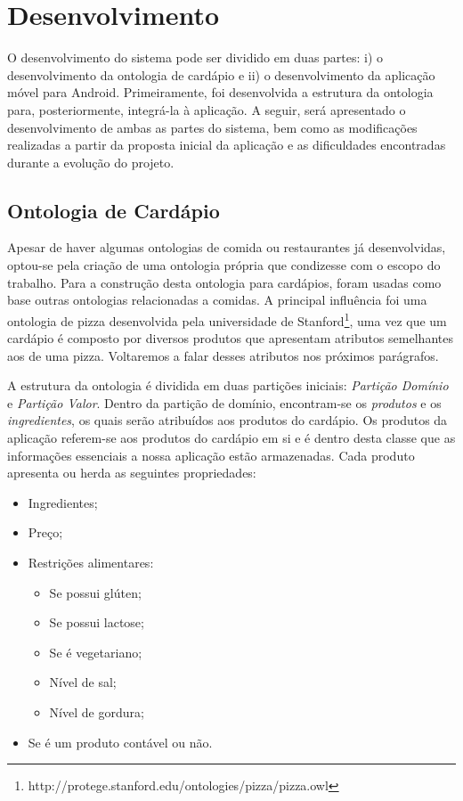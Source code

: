 \chapter{\label{chap:desenvolvimento}Desenvolvimento}

O desenvolvimento do sistema pode ser dividido em duas partes: i) o desenvolvimento da ontologia de cardápio e ii) o desenvolvimento da aplicação móvel para Android. Primeiramente, foi desenvolvida a estrutura da ontologia para, posteriormente, integrá-la à aplicação. A seguir, será apresentado o desenvolvimento de ambas as partes do sistema, bem como as modificações realizadas a partir da proposta inicial da aplicação e as dificuldades encontradas durante a evolução do projeto.

\section{\label{sec:ontologia}Ontologia de Cardápio}

Apesar de haver algumas ontologias de comida ou restaurantes já desenvolvidas, optou-se pela criação de uma ontologia própria que condizesse com o escopo do trabalho. Para a construção desta ontologia para cardápios, foram usadas como base outras ontologias relacionadas a comidas. A principal influência foi uma ontologia de pizza desenvolvida pela universidade de Stanford\footnote{http://protege.stanford.edu/ontologies/pizza/pizza.owl}, uma vez que um cardápio é composto por diversos produtos que apresentam atributos semelhantes aos de uma pizza. Voltaremos a falar desses atributos nos próximos parágrafos.

A estrutura da ontologia é dividida em duas partições iniciais: \emph{Partição Domínio} e \emph{Partição Valor}. Dentro da partição de domínio, encontram-se os \emph{produtos} e os \emph{ingredientes}, os quais serão atribuídos aos produtos do cardápio. Os produtos da aplicação referem-se aos produtos do cardápio em si e é dentro desta classe que as informações essenciais a nossa aplicação estão armazenadas. Cada produto apresenta ou herda as seguintes propriedades:
\begin{itemize}
	\item Ingredientes;
	\item Preço;
	\item Restrições alimentares:
	\begin{itemize}
		\item Se possui glúten;
		\item Se possui lactose;
		\item Se é vegetariano;
		\item Nível de sal;
		\item Nível de gordura;
	\end{itemize}
	\item Se é um produto contável ou não.
\end{itemize}

